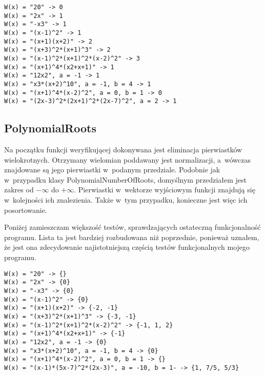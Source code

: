 \begin{lstlisting}
W(x) = "20" -> 0
W(x) = "2x" -> 1
W(x) = "-x3" -> 1
W(x) = "(x-1)^2" -> 1
W(x) = "(x+1)(x+2)" -> 2
W(x) = "(x+3)^2*(x+1)^3" -> 2
W(x) = "(x-1)^2*(x+1)^2*(x-2)^2" -> 3
W(x) = "(x+1)^4*(x2+x+1)" -> 1
W(x) = "12x2", a = -1 -> 1
W(x) = "x3*(x+2)^10", a = -1, b = 4 -> 1
W(x) = "(x+1)^4*(x-2)^2", a = 0, b = 1 -> 0
W(x) = "(2x-3)^2*(2x+1)^2*(2x-7)^2", a = 2 -> 1
\end{lstlisting}

\subsection{PolynomialRoots}

Na początku funkcji weryfikującej dokonywana jest eliminacja pierwiastków wielokrotnych. Otrzymany wielomian poddawany jest normalizacji, a~wówczas znajdowane są jego pierwiastki w~podanym przedziale. Podobnie jak w~przypadku klasy PolynomialNumberOfRoots, domyślnym przedziałem jest zakres od $-\infty$ do $+\infty$. Pierwiastki w~wektorze wyjściowym funkcji znajdują się w~kolejności ich znalezienia. Także w~tym przypadku, konieczne jest więc ich posortowanie.

Poniżej zamieszczam większość testów, sprawdzających ostateczną funkcjonalność programu. Lista ta jest bardziej rozbudowana niż poprzednie, ponieważ uznałem, że jest ona zdecydowanie najistotniejszą częścią testów funkcjonalnych mojego programu.

\begin{lstlisting}
W(x) = "20" -> {}
W(x) = "2x" -> {0}
W(x) = "-x3" -> {0}
W(x) = "(x-1)^2" -> {0}
W(x) = "(x+1)(x+2)" -> {-2, -1}
W(x) = "(x+3)^2*(x+1)^3" -> {-3, -1}
W(x) = "(x-1)^2*(x+1)^2*(x-2)^2" -> {-1, 1, 2}
W(x) = "(x+1)^4*(x2+x+1)" -> {-1}
W(x) = "12x2", a = -1 -> {0}
W(x) = "x3*(x+2)^10", a = -1, b = 4 -> {0}
W(x) = "(x+1)^4*(x-2)^2", a = 0, b = 1 -> {}
W(x) = "(x-1)*(5x-7)^2*(2x-3)", a = -10, b = 1- -> {1, 7/5, 5/3}
\end{lstlisting}

